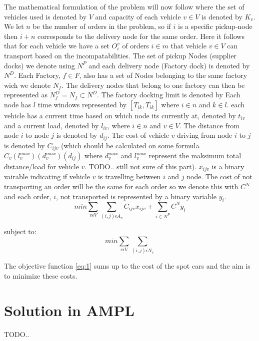 \documentclass[a4paper,12pt]{article}
\begin{document}
The mathematical formulation of the problem will now follow where the set of vehicles used is denoted by $V$ and capacity of each vehicle $v \in V$ is denoted by $K_v$. We let $n$ be the number of orders in the problem, so if $i$ is a specific pickup-node then $i+n$ corresponds to the delivery node for the same order. Here it follows that for each vehicle we have a set $O_i^v$ of orders $i \in m$ that vehicle $v \in V$ can transport based on the incompatabilities. The set of pickup Nodes (supplier docks) we denote using $N^P$ and each delivery node (Factory dock) is denoted by $N^D$. Each Factory, $f \in F$, also has a set of Nodes belonging to the same factory wich we denote $N_f$. The delivery nodes that belong to one factory can then be represented as $N_f^D = N_f \subset N^D$. The factory docking limit is denoted by  Each node has $l$ time windows represented by $[ \underline{T_{ik}},  \overline{T_{ik}} ]$ where $i \in n$ and $k \in l$. each vehicle has a current time based on which node its currently at, denoted by $t_{iv}$ and a current load, denoted by $l_{iv}$, where $i \in n$ and $v \in V$. The distance from node $i$ to node $j$ is denoted by $d_{ij}$. The cost of vehicle $v$ driving from node $i$ to $j$ is denoted by $C_{ijv}$  (which should be calculated on some formula $C_v(l^{max}_{v})(d^{max}_{v})(d_{ij})$ where $d^{max}_{v}$ and $l^{max}_{v}$ represent the maksimum total distance/load for vehicle $v$. TODO.. still not sure of this part). $x_{ijv}$ is a binary vairable indicating if vehicle $v$ is travelling between $i$ and $j$ node. The cost of not transporting an order will be the same for each order so we denote this with $C^N$ and each order, $i$,  not transported is represented by a binary variable $y_i$. 
\begin{equation} \label{eq:1}
min\sum_{v\epsilon V} \sum_{(i,j)\epsilon A_v} C_{ijv}x_{ijv} + \sum_{i\in N^P}C^Ny_i
\end{equation}

subject to:
\begin{equation}
min\sum_{v\epsilon V}\sum_{(i,j)\epsilon N_v}
\end{equation}



\par
The objective function \ref{eq:1} sums up to the cost of the spot cars and the aim is to minimize these costs.


\section{Solution in AMPL}
TODO..
\end{document}
